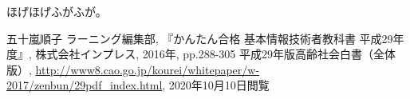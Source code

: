 \documentclass[a4j,uplatex]{jsarticle}
\begin{document}
ほげほげ\cite{refer1}ふがふが\cite{refer2}。

\begin{thebibliography}{9}
   五十嵐順子 ラーニング編集部, 『かんたん合格 基本情報技術者教科書 平成29年度』, 株式会社インプレス, 2016年, pp.288-305
   平成29年版高齢社会白書（全体版）, \url{http://www8.cao.go.jp/kourei/whitepaper/w-2017/zenbun/29pdf_index.html}, 2020年10月10日閲覧
\end{thebibliography}
\end{document}
